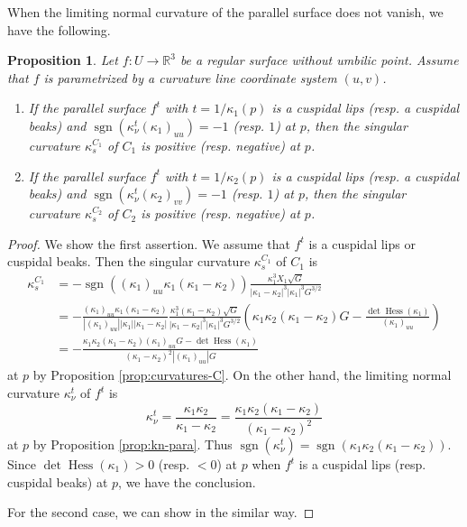 \documentclass[11pt,a4paper,pdflatex,final]{amsart}
\theoremstyle{plain}
\newtheorem{proposition}[theorem]{Proposition}%
\theoremstyle{definition}
\theoremstyle{remark}
\newcommand{\hess}{\operatorname{Hess}}
\newcommand{\sgn}{\operatorname{sgn}}
\newcommand{\0}{\bm{0}}
\newcommand{\R}{\mathbb{R}}
\numberwithin{equation}{section}
\begin{document}
When the limiting normal curvature of the parallel surface does not vanish, 
we have the following.

\begin{proposition}
	Let $f\colon U\to\R^3$ be a regular surface without umbilic point. 
	Assume that $f$ is parametrized by a curvature line coordinate system $(u,v)$. 
	\begin{enumerate}
		\item If the parallel surface $f^t$ with $t=1/\kappa_1(p)$ 
		is a cuspidal lips \textup{(}resp. a cuspidal beaks\textup{)} 
		and $\sgn(\kappa_\nu^t(\kappa_1)_{uu})=-1$ \textup{(}resp. $1$\textup{)} at $p$, 
		then the singular curvature $\kappa_s^{C_1}$ of $C_1$ is positive 
		\textup{(}resp. negative\textup{)} at $p$.
		\item If the parallel surface $f^t$ with $t=1/\kappa_2(p)$ 
		is a cuspidal lips \textup{(}resp. a cuspidal beaks\textup{)} 
		and $\sgn(\kappa_\nu^t(\kappa_2)_{vv})=-1$ \textup{(}resp. $1$\textup{)} at $p$, 
		then the singular curvature $\kappa_s^{C_2}$ of $C_2$ is positive 
		\textup{(}resp. negative\textup{)} at $p$.
	\end{enumerate}
\end{proposition}
\begin{proof}
	We show the first assertion. 
	We assume that $f^t$ is a cuspidal lips or cuspidal beaks. 
	Then the singular curvature $\kappa_s^{C_1}$ of $C_1$ is 
	\[
	\begin{aligned}
		\kappa_s^{C_1}&=-\sgn((\kappa_1)_{uu}\kappa_1(\kappa_1-\kappa_2))
		\frac{\kappa_1^3X_1\sqrt{G}}{|\kappa_1-\kappa_2|^3|\kappa_1|^3G^{3/2}}\\
		&=-\frac{(\kappa_1)_{uu}\kappa_1(\kappa_1-\kappa_2)}
		{|(\kappa_1)_{uu}||\kappa_1||\kappa_1-\kappa_2|}
		\frac{\kappa_1^3(\kappa_1-\kappa_2)\sqrt{G}}{|\kappa_1-\kappa_2|^3|\kappa_1|^3G^{3/2}}
		\left(\kappa_1\kappa_2(\kappa_1-\kappa_2)G-\frac{\det\hess(\kappa_1)}{(\kappa_1)_{uu}}\right)\\
		&=-\frac{\kappa_1\kappa_2(\kappa_1-\kappa_2)(\kappa_1)_{uu}G-\det\hess(\kappa_1)}
		{(\kappa_1-\kappa_2)^2|(\kappa_1)_{uu}|G}
	\end{aligned}
	\]
	at $p$ by Proposition \ref{prop:curvatures-C}. 
	On the other hand, the limiting normal curvature $\kappa_\nu^t$ of $f^t$ is 
	\[
	\kappa_\nu^t=\frac{\kappa_1\kappa_2}{\kappa_1-\kappa_2}
	=\frac{\kappa_1\kappa_2(\kappa_1-\kappa_2)}{(\kappa_1-\kappa_2)^2}
	\]
	at $p$ by Proposition \ref{prop:kn-para}. 
	Thus $\sgn(\kappa_\nu^t)=\sgn(\kappa_1\kappa_2(\kappa_1-\kappa_2))$. 
	Since $\det\hess(\kappa_1)>0$ (resp. $<0$) at $p$ 
	when $f^t$ is a cuspidal lips (resp. cuspidal beaks) at $p$, 
	we have the conclusion. 
	
	For the second case, we can show in the similar way. 
\end{proof}
\end{document}
